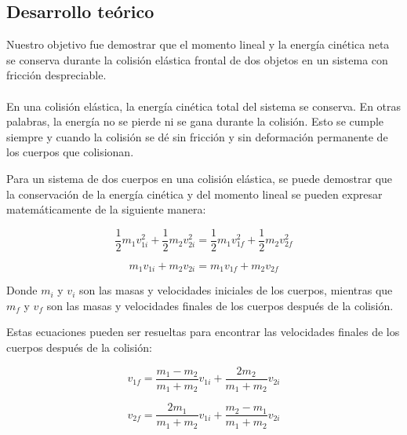 \documentclass{article}
\begin{document}

\begin{multicols}{2}

\section{Desarrollo teórico}\label{Desarrollo Teorico}                              	%
Nuestro objetivo fue demostrar que el momento lineal y la energía cinética neta se conserva durante la colisión elástica frontal de dos objetos en un sistema con fricción despreciable.
\\
\\
En una colisión elástica, la energía cinética total del sistema se conserva. En otras palabras, la energía no se pierde ni se gana durante la colisión. Esto se cumple siempre y cuando la colisión se dé sin fricción y sin deformación permanente de los cuerpos que colisionan.

Para un sistema de dos cuerpos en una colisión elástica, se puede demostrar que la conservación de la energía cinética y del momento lineal se pueden expresar matemáticamente de la siguiente manera:

\begin{equation}
\frac{1}{2}m_1v_{1i}^2 + \frac{1}{2}m_2v_{2i}^2 = \frac{1}{2}m_1v_{1f}^2 + \frac{1}{2}m_2v_{2f}^2
\end{equation}

\begin{equation}
m_1v_{1i} + m_2v_{2i} = m_1v_{1f} + m_2v_{2f}
\end{equation}

Donde $m_i$ y $v_{i}$ son las masas y velocidades iniciales de los cuerpos, mientras que $m_f$ y $v_{f}$ son las masas y velocidades finales de los cuerpos después de la colisión.

Estas ecuaciones pueden ser resueltas para encontrar las velocidades finales de los cuerpos después de la colisión:

\begin{equation}
v_{1f} = \frac{m_1 - m_2}{m_1 + m_2}v_{1i} + \frac{2m_2}{m_1 + m_2}v_{2i}
\end{equation}

\begin{equation}
v_{2f} = \frac{2m_1}{m_1 + m_2}v_{1i} + \frac{m_2 - m_1}{m_1 + m_2}v_{2i}
\end{equation}


\end{multicols}
\end{document}
